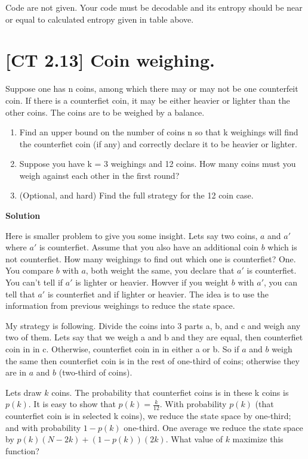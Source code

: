 \documentclass[]{article}
\providecommand{\tightlist}{%
\setlength{\itemsep}{0pt}\setlength{\parskip}{0pt}}
\begin{document}
Code are not given. Your code must be decodable and its entropy should
be near or equal to calculated entropy given in table above.

\section{{[}CT 2.13{]} Coin weighing.}\label{ct-2.13-coin-weighing.}

Suppose one has n coins, among which there may or may not be one
counterfeit coin. If there is a counterfiet coin, it may be either
heavier or lighter than the other coins. The coins are to be weighed by
a balance.

\begin{enumerate}
\def\labelenumi{\alph{enumi}.}
\tightlist
\item
  Find an upper bound on the number of coins n so that k weighings will
  find the counterfiet coin (if any) and correctly declare it to be
  heavier or lighter.
\item
  Suppose you have k = 3 weighings and 12 coins. How many coins must you
  weigh against each other in the first round?
\item
  (Optional, and hard) Find the full strategy for the 12 coin case.
\end{enumerate}

\textbf{Solution}

Here is smaller problem to give you some insight. Lets say two coins,
\(a\) and \(a'\) where \(a'\) is counterfiet. Assume that you also have
an additional coin \(b\) which is not counterfiet. How many weighings to
find out which one is counterfiet? One. You compare \(b\) with \(a\),
both weight the same, you declare that \(a'\) is counterfiet. You can't
tell if \(a'\) is lighter or heavier. Howver if you weight \(b\) with
\(a'\), you can tell that \(a'\) is counterfiet and if lighter or
heavier. The idea is to use the information from previous weighings to
reduce the state space.

My strategy is following. Divide the coins into 3 parts a, b, and c and
weigh any two of them. Lets say that we weigh a and b and they are
equal, then counterfiet coin in in c. Otherwise, counterfiet coin in in
either a or b. So if \(a\) and \(b\) weigh the same then counterfiet
coin is in the rest of one-third of coins; otherwise they are in \(a\)
and \(b\) (two-third of coins).

Lets draw \(k\) coins. The probability that counterfiet coins is in
these k coins is \(p(k)\). It is easy to show that
\(p(k) = \frac{k}{12}\). With probability \(p(k)\) (that counterfiet
coin is in selected k coins), we reduce the state space by one-third;
and with probability \(1-p(k)\) one-third. One average we reduce the
state space by \(p(k)(N-2k)+(1-p(k))(2k)\). What value of \(k\) maximize
this function?
\end{document}
